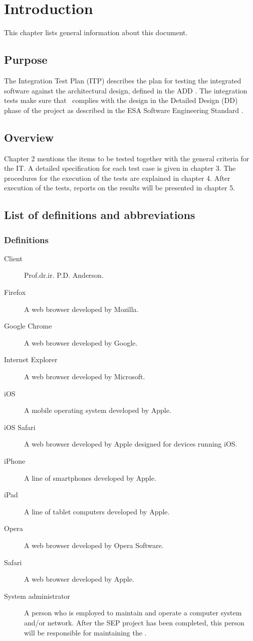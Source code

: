 \chapter{Introduction}
\label{chap:intro}
This chapter lists general information about this document.

\section{Purpose}
\label{sec:purpose}
The Integration Test Plan (ITP) describes the plan for testing the integrated software against the architectural design, defined in the ADD \cite{add}. The integration tests make sure that
\projectname\ complies with the design in the Detailed Design (DD) phase of the \projectname{} project as described in the ESA Software Engineering Standard \cite{esa}.

\section{Overview}
\label{sec:overview}
Chapter 2 mentions the items to be tested together with the general criteria for the IT. A detailed specification for each test case is given in chapter 3. The procedures for the execution of the tests are explained in chapter 4. After execution of the tests, reports on the results will be presented in chapter 5.

\section{List of definitions and abbreviations}
\label{sec:listofdef}

\subsection{Definitions}
\label{subsec:def}

\begin{description}
\item[Client] Prof.dr.ir. P.D. Anderson.
\item[Firefox] A web browser developed by Mozilla.
\item[Google Chrome] A web browser developed by Google.
\item[Internet Explorer] A web browser developed by Microsoft.
\item[iOS] A mobile operating system developed by Apple.
\item[iOS Safari] A web browser developed by Apple designed for devices running iOS.
\item[iPhone] A line of smartphones developed by Apple.
\item[iPad] A line of tablet computers developed by Apple.
\item[Opera] A web browser developed by Opera Software.
\item[Safari] A web browser developed by Apple.
\item[System administrator] A person who is employed to maintain and operate a computer system and/or network. After the SEP project has been completed, this person will be responsible for maintaining the \applicationname{}.
\end{description}

